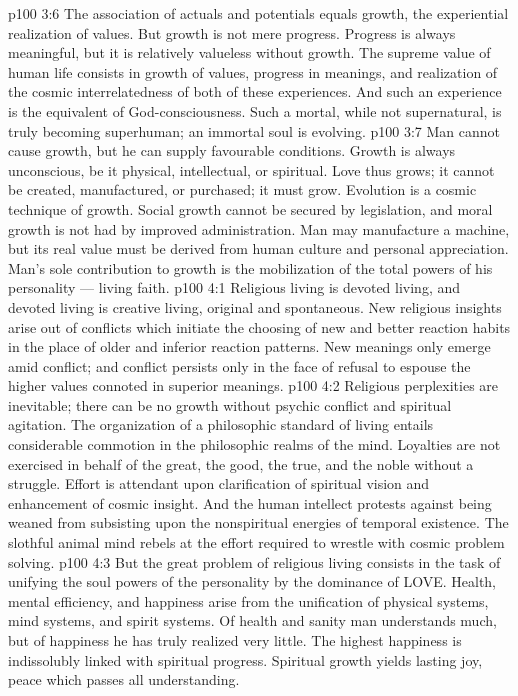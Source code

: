 \vs p100 3:6 The association of actuals and potentials equals growth, the experiential realization of values. But growth is not mere progress. Progress is always meaningful, but it is relatively valueless without growth. The supreme value of human life consists in growth of values, progress in meanings, and realization of the cosmic interrelatedness of both of these experiences. And such an experience is the equivalent of God\hyp{}consciousness. Such a mortal, while not supernatural, is truly becoming superhuman; an immortal soul is evolving.
\vs p100 3:7 Man cannot cause growth, but he can supply favourable conditions. Growth is always unconscious, be it physical, intellectual, or spiritual. Love thus grows; it cannot be created, manufactured, or purchased; it must grow. Evolution is a cosmic technique of growth. Social growth cannot be secured by legislation, and moral growth is not had by improved administration. Man may manufacture a machine, but its real value must be derived from human culture and personal appreciation. Man’s sole contribution to growth is the mobilization of the total powers of his personality --- living faith.
\vs p100 4:1 Religious living is devoted living, and devoted living is creative living, original and spontaneous. New religious insights arise out of conflicts which initiate the choosing of new and better reaction habits in the place of older and inferior reaction patterns. New meanings only emerge amid conflict; and conflict persists only in the face of refusal to espouse the higher values connoted in superior meanings.
\vs p100 4:2 Religious perplexities are inevitable; there can be no growth without psychic conflict and spiritual agitation. The organization of a philosophic standard of living entails considerable commotion in the philosophic realms of the mind. Loyalties are not exercised in behalf of the great, the good, the true, and the noble without a struggle. Effort is attendant upon clarification of spiritual vision and enhancement of cosmic insight. And the human intellect protests against being weaned from subsisting upon the nonspiritual energies of temporal existence. The slothful animal mind rebels at the effort required to wrestle with cosmic problem solving.
\vs p100 4:3 But the great problem of religious living consists in the task of unifying the soul powers of the personality by the dominance of LOVE. Health, mental efficiency, and happiness arise from the unification of physical systems, mind systems, and spirit systems. Of health and sanity man understands much, but of happiness he has truly realized very little. The highest happiness is indissolubly linked with spiritual progress. Spiritual growth yields lasting joy, peace which passes all understanding.
